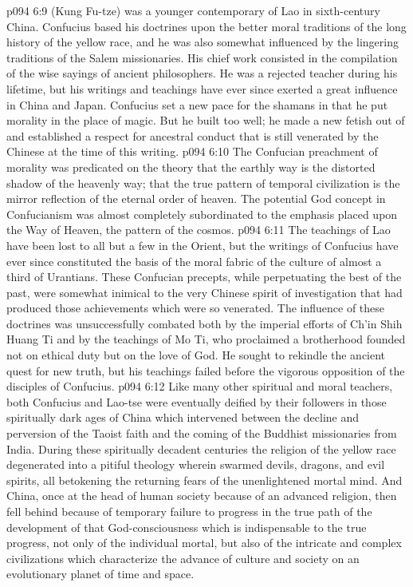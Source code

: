 \vs p094 6:9 \pc {} (Kung Fu\hyp{}tze) was a younger contemporary of Lao in sixth\hyp{}century China. Confucius based his doctrines upon the better moral traditions of the long history of the yellow race, and he was also somewhat influenced by the lingering traditions of the Salem missionaries. His chief work consisted in the compilation of the wise sayings of ancient philosophers. He was a rejected teacher during his lifetime, but his writings and teachings have ever since exerted a great influence in China and Japan. Confucius set a new pace for the shamans in that he put morality in the place of magic. But he built too well; he made a new fetish out of  and established a respect for ancestral conduct that is still venerated by the Chinese at the time of this writing.
\vs p094 6:10 The Confucian preachment of morality was predicated on the theory that the earthly way is the distorted shadow of the heavenly way; that the true pattern of temporal civilization is the mirror reflection of the eternal order of heaven. The potential God concept in Confucianism was almost completely subordinated to the emphasis placed upon the Way of Heaven, the pattern of the cosmos.
\vs p094 6:11 The teachings of Lao have been lost to all but a few in the Orient, but the writings of Confucius have ever since constituted the basis of the moral fabric of the culture of almost a third of Urantians. These Confucian precepts, while perpetuating the best of the past, were somewhat inimical to the very Chinese spirit of investigation that had produced those achievements which were so venerated. The influence of these doctrines was unsuccessfully combated both by the imperial efforts of Ch’in Shih Huang Ti and by the teachings of Mo Ti, who proclaimed a brotherhood founded not on ethical duty but on the love of God. He sought to rekindle the ancient quest for new truth, but his teachings failed before the vigorous opposition of the disciples of Confucius.
\vs p094 6:12 Like many other spiritual and moral teachers, both Confucius and Lao\hyp{}tse were eventually deified by their followers in those spiritually dark ages of China which intervened between the decline and perversion of the Taoist faith and the coming of the Buddhist missionaries from India. During these spiritually decadent centuries the religion of the yellow race degenerated into a pitiful theology wherein swarmed devils, dragons, and evil spirits, all betokening the returning fears of the unenlightened mortal mind. And China, once at the head of human society because of an advanced religion, then fell behind because of temporary failure to progress in the true path of the development of that God\hyp{}consciousness which is indispensable to the true progress, not only of the individual mortal, but also of the intricate and complex civilizations which characterize the advance of culture and society on an evolutionary planet of time and space.
